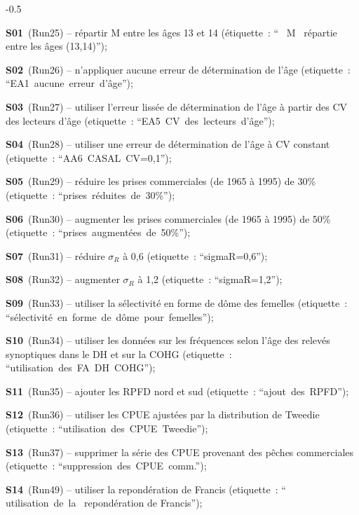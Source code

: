 \documentclass[11pt]{book}
\newcommand{\pc}{\%}
\begin{document}
\begin{itemize_csas}{-0.5}{}
  \item \textbf{S01}~(Run25)  -- r\'{e}partir M entre les \^{a}ges 13 et 14  (\'{e}tiquette~: `` ~M~ r\'{e}partie entre les \^{a}ges (13,14)'');
  \item \textbf{S02}~(Run26)  -- n'appliquer aucune erreur de d\'{e}termination de l'\^{a}ge  (etiquette~: ``EA1~aucune~erreur~d'\^{a}ge'');
  \item \textbf{S03}~(Run27)  -- utiliser l'erreur liss\'{e}e de d\'{e}termination de l'\^{a}ge \`{a} partir des CV des lecteurs d'\^{a}ge  (etiquette~: ``EA5~CV~des~lecteurs~d'\^{a}ge'');
  \item \textbf{S04}~(Run28)  -- utiliser une erreur de d\'{e}termination de l'\^{a}ge \`{a} CV constant  (etiquette~: ``AA6~CASAL~CV=0,1'');
  \item \textbf{S05}~(Run29)  -- r\'{e}duire les prises commerciales (de 1965 \`{a} 1995) de 30\pc{}  (etiquette~: ``prises~r\'{e}duites~de~30\pc{}'');
  \item \textbf{S06}~(Run30)  -- augmenter les prises commerciales (de 1965 \`{a} 1995) de 50\pc{}  (etiquette~: ``prises~augment\'{e}es~de~50\pc{}'');
  \item \textbf{S07}~(Run31)  -- r\'{e}duire $\sigma_R$ \`{a} 0,6  (etiquette~: ``sigmaR=0,6'');
  \item \textbf{S08}~(Run32)  -- augmenter $\sigma_R$ \`{a} 1,2  (etiquette~: ``sigmaR=1,2'');
  \item \textbf{S09}~(Run33)  -- utiliser la s\'{e}lectivit\'{e} en forme de d\^{o}me des femelles  (etiquette~: ``s\'{e}lectivit\'{e}~en~forme~de~d\^{o}me~pour~femelles'');
  \item \textbf{S10}~(Run34) -- utiliser les donn\'{e}es sur les fr\'{e}quences selon l'\^{a}ge des relev\'{e}s synoptiques dans le DH et sur la COHG (etiquette~: ``utilisation~des~FA~DH~COHG'');
  \item \textbf{S11}~(Run35) -- ajouter les RPFD nord et sud (etiquette~: ``ajout~des~RPFD'');
  \item \textbf{S12}~(Run36) -- utiliser les CPUE ajust\'{e}es par la distribution de Tweedie (etiquette~: ``utilisation~des~CPUE~Tweedie'');
  \item \textbf{S13}~(Run37) -- supprimer la s\'{e}rie des CPUE provenant des p\^{e}ches commerciales (etiquette~: ``suppression~des~CPUE~comm.'');
  \item \textbf{S14}~(Run49) -- utiliser la repond\'{e}ration de Francis (etiquette~: `` utilisation~de~la~ repond\'{e}ration de Francis'');
\end{itemize_csas}
\end{document}
